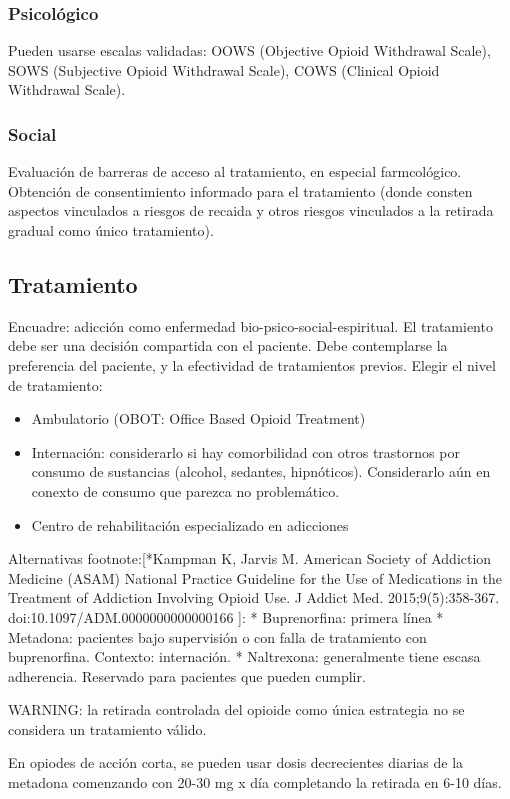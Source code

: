 \documentclass{scrbook}
\begin{document}
\subsubsection{Psicológico}
Pueden usarse escalas validadas: OOWS (Objective Opioid Withdrawal Scale), SOWS (Subjective Opioid Withdrawal Scale), COWS (Clinical Opioid Withdrawal Scale).
\subsubsection{Social}
Evaluación de barreras de acceso al tratamiento, en especial farmcológico.
Obtención de consentimiento informado para el tratamiento (donde consten aspectos vinculados a riesgos de recaida y otros riesgos vinculados a la retirada gradual como único tratamiento).
\subsection*{Tratamiento}
Encuadre: adicción como enfermedad bio-psico-social-espiritual.
El tratamiento debe ser una decisión compartida con el paciente. Debe contemplarse la preferencia del paciente, y la efectividad de tratamientos previos. Elegir el nivel de tratamiento:
\begin{itemize}
	\item Ambulatorio (OBOT: Office Based Opioid Treatment)
	\item Internación: considerarlo si hay comorbilidad con otros trastornos por consumo de sustancias (alcohol, sedantes, hipnóticos). Considerarlo aún en conexto de consumo que parezca no problemático.
	\item Centro de rehabilitación especializado en adicciones
\end{itemize}

Alternativas footnote:[*Kampman K, Jarvis M. American Society of Addiction Medicine (ASAM) National Practice Guideline for the Use of Medications in the Treatment of Addiction Involving Opioid Use. J Addict Med. 2015;9(5):358-367. doi:10.1097/ADM.0000000000000166
]:
  * Buprenorfina: primera línea
  * Metadona: pacientes bajo supervisión o con falla de tratamiento con buprenorfina. Contexto: internación.
  * Naltrexona: generalmente tiene escasa adherencia. Reservado para pacientes que pueden cumplir.

WARNING: la retirada controlada del opioide como única estrategia no se considera un tratamiento válido.

En opiodes de acción corta, se pueden usar dosis decrecientes diarias de la metadona comenzando con 20-30 mg x día completando la retirada en 6-10 días.
\end{document}
